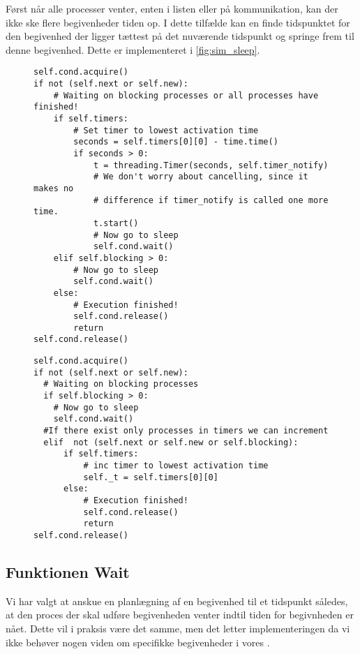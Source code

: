 Først når alle processer venter, enten i  listen eller på kommunikation, kan der ikke ske flere begivenheder tiden op. 
I dette tilfælde  kan \sched en finde tidspunktet for den begivenhed der ligger tættest på det nuværende tidspunkt  og springe frem til denne begivenhed. Dette er implementeret i \cref{fig:sim_sleep}.
\begin{figure}[hbtp]
\begin{minipage}[c]{\linewidth}
\begin{lstlisting}[firstnumber=239, label=fig:blocking_sleep, caption=Uddrag af \sched en i \code{Scheduler}]
self.cond.acquire()
if not (self.next or self.new):
    # Waiting on blocking processes or all processes have finished!
    if self.timers:
        # Set timer to lowest activation time
        seconds = self.timers[0][0] - time.time()
        if seconds > 0:
            t = threading.Timer(seconds, self.timer_notify)
            # We don't worry about cancelling, since it makes no 
            # difference if timer_notify is called one more time.
            t.start()
            # Now go to sleep
            self.cond.wait()
    elif self.blocking > 0:
        # Now go to sleep
        self.cond.wait()
    else:
        # Execution finished!
        self.cond.release()
        return
self.cond.release()
\end{lstlisting}
\end{minipage}
\begin{minipage}[c]{\linewidth}
\begin{lstlisting}[firstnumber=158, label=fig:sim_sleep, caption= uddrag af \sched en i \code{Simulation}]
self.cond.acquire()
if not (self.next or self.new):
  # Waiting on blocking processes
  if self.blocking > 0:
    # Now go to sleep
    self.cond.wait()
  #If there exist only processes in timers we can increment
  elif  not (self.next or self.new or self.blocking): 
      if self.timers:
          # inc timer to lowest activation time
          self._t = self.timers[0][0]
      else:
          # Execution finished!
          self.cond.release()
          return
self.cond.release()  
\end{lstlisting}
\end{minipage}
\end{figure}


\subsection{Funktionen Wait}\label{sec:Wait}
Vi har valgt at anskue en planlægning af en begivenhed til et tidspunkt således, at den proces der skal udføre begivenheden venter indtil tiden for begivnheden er nået. Dette vil i praksis være det samme, men det letter implementeringen da vi ikke behøver nogen viden om specifikke begivenheder i vores \sched. 

